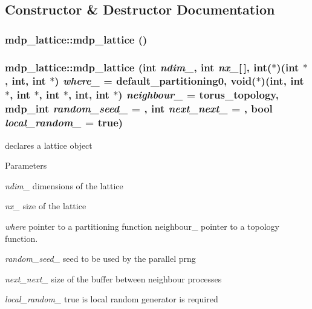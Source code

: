 \subsection{Constructor \& Destructor Documentation}
\hypertarget{classmdp__lattice_a16771b478cc1e3a6bd70487de44e7a7a}{
\subsubsection[{mdp\_\-lattice}]{\setlength{\rightskip}{0pt plus 5cm}mdp\_\-lattice::mdp\_\-lattice ()}}
\label{classmdp__lattice_a16771b478cc1e3a6bd70487de44e7a7a}
\hypertarget{classmdp__lattice_a90f0e67a6947ec2cab8065cef94d3ceb}{
\subsubsection[{mdp\_\-lattice}]{\setlength{\rightskip}{0pt plus 5cm}mdp\_\-lattice::mdp\_\-lattice (int {\em ndim\_\-}, \/  int {\em nx\_\-}\mbox{[}$\,$\mbox{]}, \/  int($\ast$)(int $\ast$, int, int $\ast$) {\em where\_\-} = {\ttfamily default\_\-partitioning0}, \/  void($\ast$)(int, int $\ast$, int $\ast$, int $\ast$, int, int $\ast$) {\em neighbour\_\-} = {\ttfamily torus\_\-topology}, \/  {\bf mdp\_\-int} {\em random\_\-seed\_\-} = {}, \/  int {\em next\_\-next\_\-} = {}, \/  bool {\em local\_\-random\_\-} = {\ttfamily true})}}
\label{classmdp__lattice_a90f0e67a6947ec2cab8065cef94d3ceb}
declares a lattice object 
\begin{DoxyParams}{Parameters}
\item[{\em ndim\_\-}]dimensions of the lattice \item[{\em nx\_\-}]size of the lattice \item[{\em where}]pointer to a partitioning function  neighbour\_\- pointer to a topology function. \item[{\em random\_\-seed\_\-}]seed to be used by the parallel prng \item[{\em next\_\-next\_\-}]size of the buffer between neighbour processes \item[{\em local\_\-random\_\-}]true is local random generator is required \end{DoxyParams}
